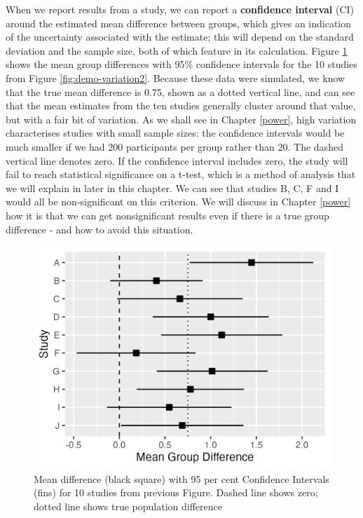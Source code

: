 \documentclass{krantz}
\begin{document}
When we report results from a study, we can report a \textbf{confidence interval} (CI) around the estimated mean difference between groups, which gives an indication of the uncertainty associated with the estimate; this will depend on the standard deviation and the sample size, both of which feature in its calculation. Figure \ref{fig:ciplot} shows the mean group differences with 95\% confidence intervals for the 10 studies from Figure \ref{fig:demo-variation2}. Because these data were simulated, we know that the true mean difference is 0.75, shown as a dotted vertical line, and can see that the mean estimates from the ten studies generally cluster around that value, but with a fair bit of variation. As we shall see in Chapter \ref{power}, high variation characterises studies with small sample sizes: the confidence intervals would be much smaller if we had 200 participants per group rather than 20. The dashed vertical line denotes zero. If the confidence interval includes zero, the study will fail to reach statistical significance on a t-test, which is a method of analysis that we will explain in later in this chapter. We can see that studies B, C, F and I would all be non-significant on this criterion. We will discuss in Chapter \ref{power} how it is that we can get nonsignificant results even if there is a true group difference - and how to avoid this situation.

\begin{center}
\begin{figure}
\includegraphics[width=0.75\linewidth]{images_bw/carbo10CI} \caption{Mean difference (black square) with 95 per cent Confidence Intervals (fins) for 10 studies from previous Figure. Dashed line shows zero; dotted line shows true population difference}\label{fig:ciplot}
\end{figure}
\end{center}
\end{document}
